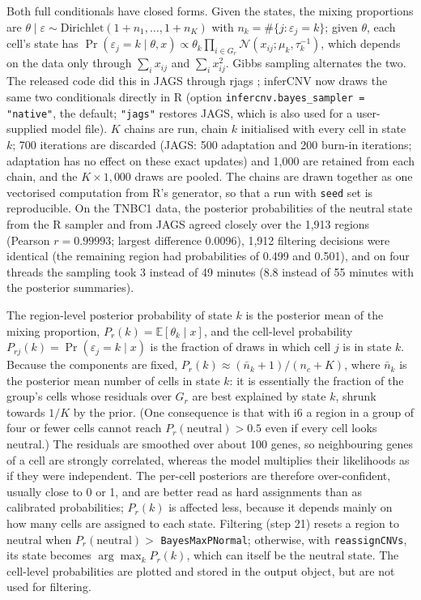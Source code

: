 Both full conditionals have closed forms. Given the states, the mixing proportions are $\theta\mid\varepsilon \sim \mathrm{Dirichlet}(1+n_1,\dots,1+n_K)$ with $n_k=\#\{j:\varepsilon_j=k\}$; given $\theta$, each cell's state has $\Pr(\varepsilon_j=k\mid\theta,x)\propto\theta_k\prod_{i\in G_r}\mathcal N(x_{ij};\mu_k,\tau_k^{-1})$, which depends on the data only through $\sum_i x_{ij}$ and $\sum_i x_{ij}^2$. Gibbs sampling alternates the two. The released code did this in JAGS \citep{plummer2003jags} through rjags \citep{rjags}; inferCNV now draws the same two conditionals directly in R (option \texttt{infercnv.bayes\_sampler = "native"}, the default; \texttt{"jags"} restores JAGS, which is also used for a user-supplied model file). $K$ chains are run, chain $k$ initialised with every cell in state $k$; 700 iterations are discarded (JAGS: 500 adaptation and 200 burn-in iterations; adaptation has no effect on these exact updates) and 1,000 are retained from each chain, and the $K\times 1{,}000$ draws are pooled. The chains are drawn together as one vectorised computation from R's generator, so that a run with \texttt{seed} set is reproducible. On the TNBC1 data, the posterior probabilities of the neutral state from the R sampler and from JAGS agreed closely over the 1,913 regions (Pearson $r=0.99993$; largest difference 0.0096), 1,912 filtering decisions were identical (the remaining region had probabilities of 0.499 and 0.501), and on four threads the sampling took 3 instead of 49 minutes (8.8 instead of 55 minutes with the posterior summaries).

The region-level posterior probability of state $k$ is the posterior mean of the mixing proportion, $P_r(k)=\mathbb E[\theta_k\mid x]$, and the cell-level probability $P_{rj}(k)=\Pr(\varepsilon_j=k\mid x)$ is the fraction of draws in which cell $j$ is in state $k$. Because the components are fixed, $P_r(k)\approx(\bar n_k+1)/(n_c+K)$, where $\bar n_k$ is the posterior mean number of cells in state $k$: it is essentially the fraction of the group's cells whose residuals over $G_r$ are best explained by state $k$, shrunk towards $1/K$ by the prior. (One consequence is that with i6 a region in a group of four or fewer cells cannot reach $P_r(\text{neutral})>0.5$ even if every cell looks neutral.) The residuals are smoothed over about 100 genes, so neighbouring genes of a cell are strongly correlated, whereas the model multiplies their likelihoods as if they were independent. The per-cell posteriors are therefore over-confident, usually close to 0 or 1, and are better read as hard assignments than as calibrated probabilities; $P_r(k)$ is affected less, because it depends mainly on how many cells are assigned to each state. Filtering (step 21) resets a region to neutral when $P_r(\text{neutral})>$ \texttt{BayesMaxPNormal}; otherwise, with \texttt{reassignCNVs}, its state becomes $\arg\max_k P_r(k)$, which can itself be the neutral state. The cell-level probabilities are plotted and stored in the output object, but are not used for filtering.

